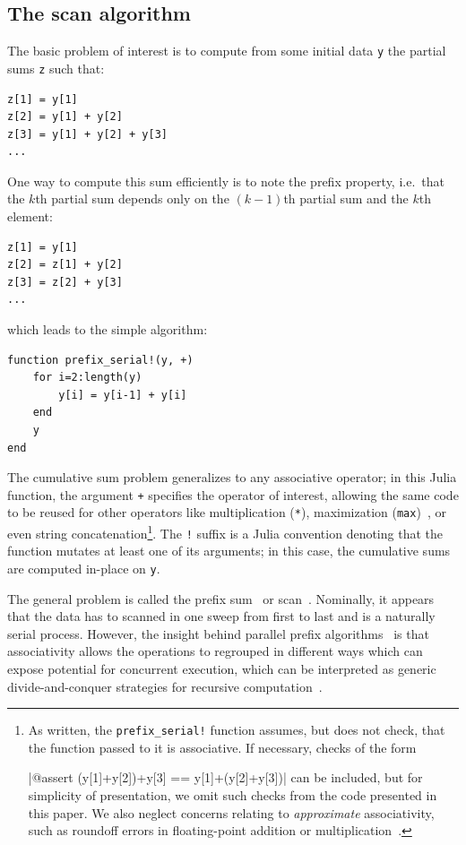 \documentclass{sig-alternate}
\newcommand{\code}[1]{\texttt{#1}}
\begin{document}
\subsection{The scan algorithm}
\label{sec:prefix}

The basic problem of interest is to compute from some initial data \code{y} the
partial sums \code{z} such that:

\begin{verbatim}
z[1] = y[1]
z[2] = y[1] + y[2]
z[3] = y[1] + y[2] + y[3]
...
\end{verbatim}
%
One way to compute this sum efficiently is to note the prefix property, i.e.\
that the $k$th partial sum depends only on the $(k-1)$th partial sum and the
$k$th element: 

\begin{verbatim}
z[1] = y[1]
z[2] = z[1] + y[2]
z[3] = z[2] + y[3]
...
\end{verbatim}
%
which leads to the simple algorithm:

\begin{verbatim}
function prefix_serial!(y, +)
    for i=2:length(y)
        y[i] = y[i-1] + y[i]
    end
    y
end
\end{verbatim}

The cumulative sum problem generalizes to any associative operator; in this
Julia function, the argument \code{+} specifies the operator of interest,
allowing the same code to be reused for other operators like multiplication
(\code{*}), maximization (\code{max})~\cite{Shah2013}, or even string
concatenation\footnote{As written, the \code{prefix\allowbreak\_serial!}
function assumes, but does not check, that the function passed to it is
associative. If necessary, checks of the form

|@assert (y[1]+y[2])+y[3] == y[1]+(y[2]+y[3])|
%
can be included, but for simplicity of presentation, we omit such checks from
the code presented in this paper. We also neglect concerns relating to
\textit{approximate} associativity, such as roundoff errors in floating-point
addition or multiplication~\cite{Mathias1995}.}. The \code{!} suffix is a Julia
convention denoting that the function mutates at least one of its arguments; in
this case, the cumulative sums are computed in-place on \code{y}.

The general problem is called the prefix sum~\cite{Blelloch1989,Blelloch1993} or 
scan~\cite{Iverson1962,Iverson1979}. Nominally, it appears that the data has to
scanned in one sweep from first to last and is a naturally serial process.
However, the insight behind parallel prefix
algorithms~\cite{Blelloch1989,Brent1982,Kogge1973,Kruskal1985,Ladner1980,Sklansky1960}
is that associativity allows the operations to regrouped in different ways
which can expose potential for concurrent execution, which can be interpreted
as generic divide-and-conquer strategies for recursive computation~\cite{Smith1987}.
\end{document}
